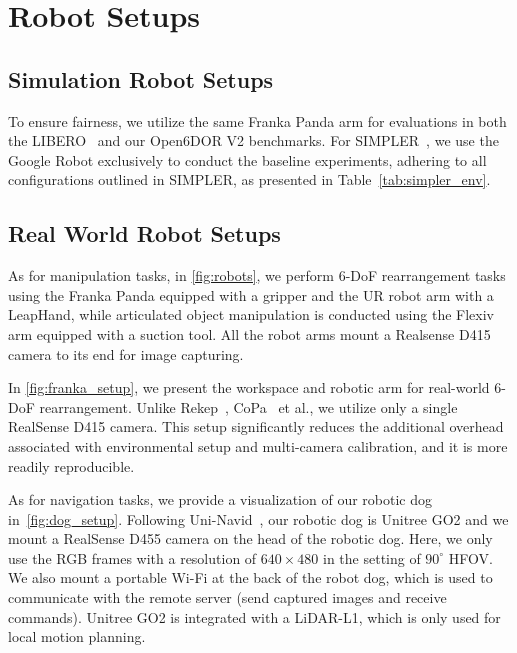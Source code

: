 \newpage
\appendix
\appendices

\section{Robot Setups}\label{app:robot_setup}

\subsection{Simulation Robot Setups}
To ensure fairness, we utilize the same Franka Panda arm for evaluations in both the LIBERO~\cite{LIBERO23} and our Open6DOR V2 benchmarks. For SIMPLER~\cite{simplerenv24}, we use the Google Robot exclusively to conduct the baseline experiments, adhering to all configurations outlined in SIMPLER, as presented in Table~\ref{tab:simpler_env}. 

\subsection{Real World Robot Setups}
As for manipulation tasks, in \cref{fig:robots}, we perform 6-DoF rearrangement tasks using the Franka Panda equipped with a gripper and the UR robot arm with a LeapHand, while articulated object manipulation is conducted using the Flexiv arm equipped with a suction tool. All the robot arms mount a Realsense D415 camera to its end for image capturing.


In \cref{fig:franka_setup}, we present the workspace and robotic arm for real-world 6-DoF rearrangement. Unlike Rekep~\cite{ReKep24}, CoPa~\cite{CoPa24} et al., we utilize only a single RealSense D415 camera. This setup significantly reduces the additional overhead associated with environmental setup and multi-camera calibration, and it is more readily reproducible.


As for navigation tasks, we provide a visualization of our robotic dog in~\cref{fig:dog_setup}. Following Uni-Navid~\cite{uninavid24}, our robotic dog is Unitree GO2 and we mount a RealSense D455 camera on the head of the robotic dog. Here, we only use the RGB frames with a resolution of $640\times480$ in the setting of  $90^\circ$ HFOV. We also mount a portable Wi-Fi at the back of the robot dog, which is used to communicate with the remote server (send captured images and receive commands). Unitree GO2 is integrated with a LiDAR-L1, which is only used for local motion planning. 



